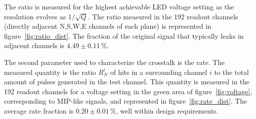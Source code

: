 \documentclass[a4paper,11pt]{article}
\begin{document}
The ratio is measured for the highest achievable LED voltage setting as the resolution evolves as $1/\sqrt{Q}$. The ratio measured in the 192 readout channels (directly adjacent N,S,W,E channels of each plane) is represented in figure~\ref{fig:ratio_dist}. The fraction of the original signal that typically leaks in adjacent channels is $4.49\pm0.11\,\%$.

The second parameter used to characterize the crosstalk is the rate. The measured quantity is the ratio $R_N^i$ of hits in a surrounding channel $i$ to the total amount of pulses generated in the test channel. This quantity is measured in the 192 readout channels for a voltage setting in the green area of figure~\ref{fig:voltage}, corresponding to MIP-like signals, and represented in figure~\ref{fig:rate_dist}. The average rate fraction is $0.20\pm0.01\,\%$, well within design requirements.
\end{document}
